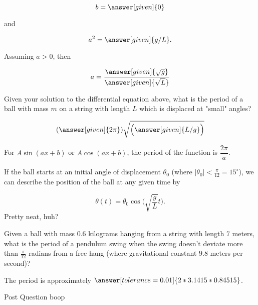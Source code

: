 \documentclass[handout,nooutcomes]{ximera}
\begin{document}
\begin{example}
\begin{explanation}
\begin{question}
\[
b = \answer[given]{0}
\]

and 

\[
a^2 = \answer[given]{g/L}.
\]

Assuming $a>0$, then 

\[
a = \dfrac{\answer[given]{\sqrt{g}}}{\answer[given]{\sqrt{L}}}
\]
\end{question}

\begin{question}
Given your solution to the differential equation above, what is the period of a ball with mass $m$ on a string with length $L$ which is displaced at "small" angles?

\[
(\answer[given]{2\pi})\sqrt{\Big(\answer[given]{L/g}\Big)}
\]
\begin{hint}
For $A\sin(ax+b)$ or $A\cos(ax+b)$, the period of the function is $\dfrac{2\pi}{a}$.
\end{hint}
\end{question}

If the ball starts at an initial angle of displacement $\theta_0$
(where $|\theta_0|<\frac{\pi}{12}= 15^\circ$), we can describe
the position of the ball at any given time by

\[
\theta(t) = \theta_0 \cos\Big(\sqrt{\frac{g}{L}} t\Big).
\]
Pretty neat, huh?

\begin{question}
Given a ball with mass $0.6$ kilograms hanging from a string with length $7$ meters, what is the period of a pendulum swing when the swing doesn't deviate more than $\frac{\pi}{12}$ radians from a free hang (where gravitational constant $9.8$ meters per second)?


The period is approximately $\answer[tolerance=0.01]{2*3.1415*0.84515}$.

\end{question}

Post Question boop
\end{explanation}
\end{example}
\end{document}
